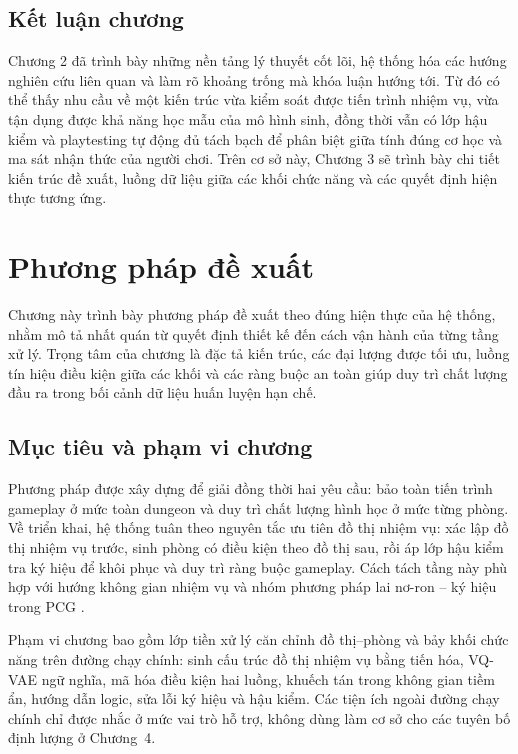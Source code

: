 \documentclass[oneside,a4paper,12pt]{extreport}
\begin{document}
\section{Kết luận chương}
Chương 2 đã trình bày những nền tảng lý thuyết cốt lõi, hệ thống hóa các hướng nghiên cứu liên quan và làm rõ khoảng trống mà khóa luận hướng tới. Từ đó có thể thấy nhu cầu về một kiến trúc vừa kiểm soát được tiến trình nhiệm vụ, vừa tận dụng được khả năng học mẫu của mô hình sinh, đồng thời vẫn có lớp hậu kiểm và playtesting tự động đủ tách bạch để phân biệt giữa tính đúng cơ học và ma sát nhận thức của người chơi. Trên cơ sở này, Chương 3 sẽ trình bày chi tiết kiến trúc đề xuất, luồng dữ liệu giữa các khối chức năng và các quyết định hiện thực tương ứng.

\chapter{Phương pháp đề xuất}
Chương này trình bày phương pháp đề xuất theo đúng hiện thực của hệ thống, nhằm mô tả nhất quán từ quyết định thiết kế đến cách vận hành của từng tầng xử lý. Trọng tâm của chương là đặc tả kiến trúc, các đại lượng được tối ưu, luồng tín hiệu điều kiện giữa các khối và các ràng buộc an toàn giúp duy trì chất lượng đầu ra trong bối cảnh dữ liệu huấn luyện hạn chế.

\section{Mục tiêu và phạm vi chương}
Phương pháp được xây dựng để giải đồng thời hai yêu cầu: bảo toàn tiến trình gameplay ở mức toàn dungeon và duy trì chất lượng hình học ở mức từng phòng. Về triển khai, hệ thống tuân theo nguyên tắc ưu tiên đồ thị nhiệm vụ: xác lập đồ thị nhiệm vụ trước, sinh phòng có điều kiện theo đồ thị sau, rồi áp lớp hậu kiểm tra ký hiệu để khôi phục và duy trì ràng buộc gameplay. Cách tách tầng này phù hợp với hướng không gian nhiệm vụ và nhóm phương pháp lai nơ-ron -- ký hiệu trong PCG \cite{dormans2011missionspaces,rodriguez2019bootstrapping}.

Phạm vi chương bao gồm lớp tiền xử lý căn chỉnh đồ thị--phòng và bảy khối chức năng trên đường chạy chính: sinh cấu trúc đồ thị nhiệm vụ bằng tiến hóa, VQ-VAE ngữ nghĩa, mã hóa điều kiện hai luồng, khuếch tán trong không gian tiềm ẩn, hướng dẫn logic, sửa lỗi ký hiệu và hậu kiểm. Các tiện ích ngoài đường chạy chính chỉ được nhắc ở mức vai trò hỗ trợ, không dùng làm cơ sở cho các tuyên bố định lượng ở Chương~4.
\end{document}
